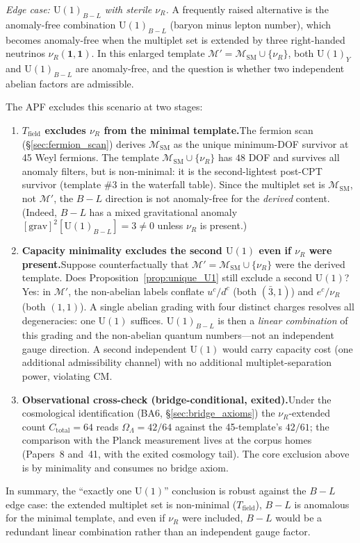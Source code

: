\documentclass[11pt]{article}
\theoremstyle{definition}
\newcommand{\U}{\mathrm{U}}
\begin{document}
\smallskip\noindent\textit{Edge case: $\U(1)_{B-L}$ with sterile
$\nu_R$.}\quad
A frequently raised alternative is the anomaly-free combination
$\U(1)_{B-L}$ (baryon minus lepton number), which becomes anomaly-free
when the multiplet set is extended by three right-handed neutrinos
$\nu_R(\mathbf{1},\mathbf{1})$.  In this enlarged template
$\mathcal{M}' = \mathcal{M}_{\mathrm{SM}} \cup \{\nu_R\}$, both
$\U(1)_Y$ and $\U(1)_{B-L}$ are anomaly-free, and the question is
whether two independent abelian factors are admissible.

The APF excludes this scenario at two stages:
\begin{enumerate}[label=(\alph*),nosep]
  \item \textbf{$T_{\mathrm{field}}$ excludes $\nu_R$ from the minimal
  template.}\quad The fermion scan (\S\ref{sec:fermion_scan}) derives
  $\mathcal{M}_{\mathrm{SM}}$ as the unique minimum-DOF survivor at
  45 Weyl fermions.  The template
  $\mathcal{M}_{\mathrm{SM}} \cup \{\nu_R\}$ has $48$ DOF and survives
  all anomaly filters, but is non-minimal: it is the second-lightest
  post-CPT survivor (template \#3 in the waterfall table).  Since the
  multiplet set is $\mathcal{M}_{\mathrm{SM}}$, not $\mathcal{M}'$,
  the $B{-}L$ direction is not anomaly-free for the \emph{derived}
  content.  (Indeed, $B{-}L$ has a mixed gravitational anomaly
  $[\mathrm{grav}]^2[\U(1)_{B-L}] = 3 \ne 0$ unless $\nu_R$ is
  present.)
  \item \textbf{Capacity minimality excludes the second $\U(1)$ even
  if $\nu_R$ were present.}\quad Suppose counterfactually that
  $\mathcal{M}' = \mathcal{M}_{\mathrm{SM}} \cup \{\nu_R\}$ were the
  derived template.  Does Proposition~\ref{prop:unique_U1} still
  exclude a second $\U(1)$?  Yes: in $\mathcal{M}'$, the non-abelian
  labels conflate $u^c / d^c$ (both $(\bar{3},1)$) and
  $e^c / \nu_R$ (both $(1,1)$).  A single abelian grading with four
  distinct charges resolves all degeneracies: one $\U(1)$ suffices.
  $\U(1)_{B-L}$ is then a \emph{linear combination} of this grading
  and the non-abelian quantum numbers---not an independent gauge
  direction.  A second independent $\U(1)$ would carry capacity cost
  (one additional admissibility channel) with no additional
  multiplet-separation power, violating CM.
  \item \textbf{Observational cross-check (bridge-conditional,
  exited).}\quad Under the cosmological identification (BA6,
  \S\ref{sec:bridge_axioms}) the $\nu_R$-extended count
  $C_{\mathrm{total}} = 64$ reads $\Omega_\Lambda = 42/64$ against
  the 45-template's $42/61$; the comparison with the Planck
  measurement lives at the corpus homes (Papers~8 and~41, with the
  exited cosmology tail).  The core exclusion above is by minimality
  and consumes no bridge axiom.
\end{enumerate}
In summary, the ``exactly one $\U(1)$'' conclusion is robust against
the $B{-}L$ edge case: the extended multiplet set is non-minimal
($T_{\mathrm{field}}$), $B{-}L$ is anomalous for the minimal template,
and even if $\nu_R$ were included, $B{-}L$ would be a redundant linear
combination rather than an independent gauge factor.
\end{document}
